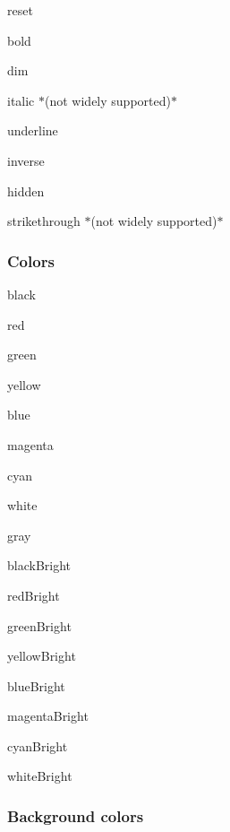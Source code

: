 \begin{DoxyItemize}
\item {\ttfamily reset}
\item {\ttfamily bold}
\item {\ttfamily dim}
\item {\ttfamily italic} $\ast$(not widely supported)$\ast$
\item {\ttfamily underline}
\item {\ttfamily inverse}
\item {\ttfamily hidden}
\item {\ttfamily strikethrough} $\ast$(not widely supported)$\ast$
\end{DoxyItemize}

\subsubsection*{Colors}


\begin{DoxyItemize}
\item {\ttfamily black}
\item {\ttfamily red}
\item {\ttfamily green}
\item {\ttfamily yellow}
\item {\ttfamily blue}
\item {\ttfamily magenta}
\item {\ttfamily cyan}
\item {\ttfamily white}
\item {\ttfamily gray}
\item {\ttfamily black\+Bright}
\item {\ttfamily red\+Bright}
\item {\ttfamily green\+Bright}
\item {\ttfamily yellow\+Bright}
\item {\ttfamily blue\+Bright}
\item {\ttfamily magenta\+Bright}
\item {\ttfamily cyan\+Bright}
\item {\ttfamily white\+Bright}
\end{DoxyItemize}

\subsubsection*{Background colors}



